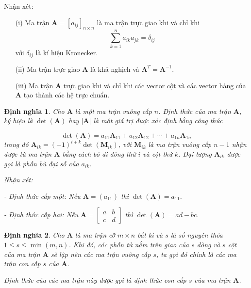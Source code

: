 \documentclass[12pt,a4paper,oneside]{report}
\newtheorem{dn}{Định nghĩa}[section]
\numberwithin{equation}{section}
\begin{document}
	Nhận xét:
	\begin{itemize}
	
	\item[(i)] Ma trận $\mathbf{A}=\left[a_{i j}\right]_{n \times n}$ là ma trận trực giao khi và chỉ khi $$\sum_{k=1}^{n} a_{i k} a_{j k}=\delta_{i j}$$ với $\delta_{i j}$ là kí hiệu Kronecker. 
	
	\item[(ii)] Ma trận trực giao $\mathbf{A}$ là khả nghịch và $\mathbf{A}^{T}=\mathbf{A}^{-1}$.
	
	\item[(iii)]  Ma trận $\mathbf{A}$ trực giao khi và chỉ khi các vector cột và các vector hàng của $\mathbf{A}$ tạo thành các hệ trực chuẩn.
	\end{itemize}
\begin{dn}\rm 
	Cho $\mathbf{A}$ là một ma trận vuông cấp $n$. Định thức của ma trận $\mathbf{A}$, ký hiệu là $\operatorname{det}(\mathbf{A})$ hay $|\mathbf{A}|$ là một giá trị được xác định bằng công thức
	
	$$
	\operatorname{det}(\mathbf{A})=a_{11} \mathbf{A}_{11}+a_{12} \mathbf{A}_{12}+\cdots+a_{1 n} \mathbf{A}_{1 n}
	$$
	trong đó $\mathbf{A}_{i k}=(-1)^{i+k} \operatorname{det}\left(\mathbf{M}_{i k}\right)$, với $\mathbf{M}_{i k}$ là ma trận vuông cấp $n-1$ nhận được từ ma trận $\mathbf{A}$ bằng cách bỏ đi dòng thứ $i$ và cột thứ $k$. Đại lượng $\mathbf{A}_{i k}$ được gọi là phần bù đại số của $a_{i k}$.
	
	Nhận xét:
	
	- Định thức cấp một: Nếu $\mathbf{A}=\left(a_{11}\right)$ thì $\operatorname{det}(\mathbf{A})=a_{11}$.
	
	- Định thức cấp hai: Nếu $\mathbf{A}=\left[\begin{array}{ll}a & b \\ c & d\end{array}\right]$ thì $\operatorname{det}(\mathbf{A})=a d-b c$.
\end{dn}
\begin{dn}\rm 
	Cho $\mathbf{A}$ là ma trận cỡ $m \times n$ bất kì và $s$ là số nguyên thỏa $1 \leqslant s \leqslant \min (m, n)$. Khi đó, các phần tử nằm trên giao của $s$ dòng và $s$ cột của ma trận $\mathbf{A}$ sẽ lập nên các ma trận vuông cấp $s$, ta gọi đó chính là các ma trận con cấp $s$ của $\mathbf{A}$.
	
	Định thức của các ma trận này được gọi là định thức con cấp $s$ của ma trận $\mathbf{A}$.
\end{dn}
\end{document}

